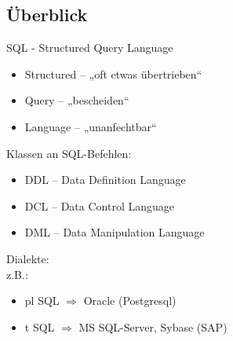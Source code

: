 \subsection{Überblick}
SQL - Structured Query Language
\begin{itemize}
\item Structured -- „oft etwas übertrieben“
\item Query -- „bescheiden“
\item Language -- „unanfechtbar“
\end{itemize}
Klassen an SQL-Befehlen:
\begin{itemize}
\item DDL -- Data Definition Language
\item DCL -- Data Control Language
\item DML -- Data Manipulation Language
\end{itemize}
Dialekte:\\
z.B.:
\begin{itemize}
\item pl SQL $\Rightarrow$ Oracle (Postgresql)
\item t SQL $\Rightarrow$ MS SQL-Server, Sybase (SAP)
\end{itemize}
